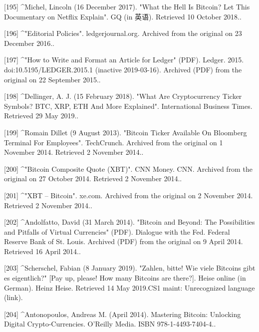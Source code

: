 [195]
^Michel, Lincoln (16 December 2017). "What the Hell Is Bitcoin? Let This Documentary on Netflix Explain". GQ (in 英语). Retrieved 10 October 2018..

[196]
^"Editorial Policies". ledgerjournal.org. Archived from the original on 23 December 2016..

[197]
^"How to Write and Format an Article for Ledger" (PDF). Ledger. 2015. doi:10.5195/LEDGER.2015.1 (inactive 2019-03-16). Archived (PDF) from the original on 22 September 2015..

[198]
^Dellinger, A. J. (15 February 2018). "What Are Cryptocurrency Ticker Symbols? BTC, XRP, ETH And More Explained". International Business Times. Retrieved 29 May 2019..

[199]
^Romain Dillet (9 August 2013). "Bitcoin Ticker Available On Bloomberg Terminal For Employees". TechCrunch. Archived from the original on 1 November 2014. Retrieved 2 November 2014..

[200]
^"Bitcoin Composite Quote (XBT)". CNN Money. CNN. Archived from the original on 27 October 2014. Retrieved 2 November 2014..

[201]
^"XBT – Bitcoin". xe.com. Archived from the original on 2 November 2014. Retrieved 2 November 2014..

[202]
^Andolfatto, David (31 March 2014). "Bitcoin and Beyond: The Possibilities and Pitfalls of Virtual Currencies" (PDF). Dialogue with the Fed. Federal Reserve Bank of St. Louis. Archived (PDF) from the original on 9 April 2014. Retrieved 16 April 2014..

[203]
^Scherschel, Fabian (8 January 2019). "Zahlen, bitte! Wie viele Bitcoins gibt es eigentlich?" [Pay up, please! How many Bitcoins are there?]. Heise online (in German). Heinz Heise. Retrieved 14 May 2019.CS1 maint: Unrecognized language (link).

[204]
^Antonopoulos, Andreas M. (April 2014). Mastering Bitcoin: Unlocking Digital Crypto-Currencies. O'Reilly Media. ISBN 978-1-4493-7404-4..